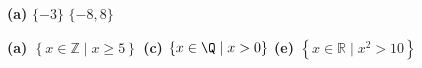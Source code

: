 \begin{list}{\bf{\ref{exer:sec23-4new}.}}
\item {\bf{(a)}} $\{-3 \}$  $\{-8, 8 \}$
\end{list}

\begin{list}{\bf{\ref{exer:sec21-3}.}} 
\item \bf{(a)} $\left\{ x\in \mathbb{Z} \mid x \geq 5 \right\}$ \quad \textbf{(c)} $\left\{ x \in \Q \mid x > 0 \right\}$ \quad 
\textbf{(e)}  $\left\{ x\in \mathbb{R} \mid x^2 > 10 \right\}$
\end{list}

%
\hbreak
